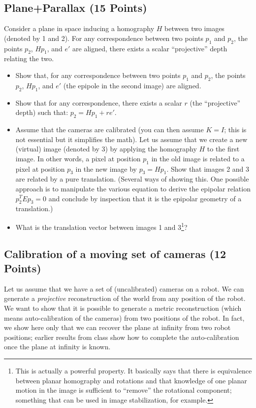 \documentclass[11pt]{article}
\begin{document}
\subsection{Plane+Parallax (15 Points)}

Consider a plane in space inducing a homography $H$ between two images (denoted by 1 and 2). For any correspondence between two points $p_1$ and $p_2$, the points $p_2$, $Hp_1$, and $e'$ are aligned, there exists a scalar ``projective'' depth relating the two.
\begin{itemize}

\item Show that, for any correspondence between two points $p_1$ and $p_2$, the points $p_2$, $Hp_1$, and $e'$ (the epipole in the second image) are aligned.

\item Show that for any correspondence, there exists a scalar $r$ (the ``projective'' depth) such that: $p_2 = Hp_1 + re'$.

\item Assume that the cameras are calibrated (you can then assume $K=I$; this is not essential but it simplifies the math). Let us assume that we create a new (virtual) image (denoted by 3) by applying the homography $H$ to the first image. In other words, 
a pixel at position $p_1$ in the old image is related to a pixel at position $p_3$ in the new image by $p_3 = Hp_1$. Show that images 2 and 3
are related by a pure translation. (Several ways of showing this. One possible approach is to manipulate the various equation to derive the
epipolar relation $p_2^TEp_3 = 0$ and conclude by inspection that it is the epipolar geometry of a translation.)

\item What is the translation vector between images 1 and 3\footnote{This is actually a powerful property. It basically says that there is equivalence between planar homography and rotations and that knowledge of one planar motion in the image is sufficient to ``remove'' the rotational component; something that can be used in image stabilization, for example.}? 
\end{itemize} 

\subsection{Calibration of a moving set of cameras (12 Points)}
Let us assume that we have a set of (uncalibrated) cameras on a robot. We can generate a {\em projective} 
reconstruction of the world from any position of the robot. We want to show that it is possible to generate a metric
reconstruction (which means auto-calibration of the cameras) from two positions of the robot. In fact, we show here only that
we can recover the plane at infinity from two robot positions; earlier results from class show how to complete the 
auto-calibration once the plane at infinity is known.\\
\end{document}
